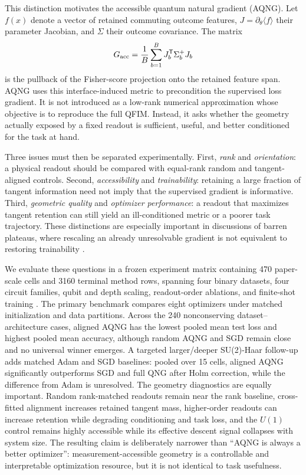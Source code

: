 This distinction motivates the accessible quantum natural gradient (AQNG). Let $f(x)$ denote a vector of retained commuting outcome features, $J=\partial_\theta\langle f\rangle$ their parameter Jacobian, and $\Sigma$ their outcome covariance. The matrix
\begin{equation}
 G_{\rm acc}=\frac{1}{B}\sum_{b=1}^{B}J_b^{\mathsf T}\Sigma_b^{+}J_b
 \label{eq:gacc_intro}
\end{equation}
is the pullback of the Fisher-score projection onto the retained feature span. AQNG uses this interface-induced metric to precondition the supervised loss gradient. It is not introduced as a low-rank numerical approximation whose objective is to reproduce the full QFIM. Instead, it asks whether the geometry actually exposed by a fixed readout is sufficient, useful, and better conditioned for the task at hand.

Three issues must then be separated experimentally. First, \emph{rank} and \emph{orientation}: a physical readout should be compared with equal-rank random and tangent-aligned controls. Second, \emph{accessibility} and \emph{trainability}: retaining a large fraction of tangent information need not imply that the supervised gradient is informative. Third, \emph{geometric quality} and \emph{optimizer performance}: a readout that maximizes tangent retention can still yield an ill-conditioned metric or a poorer task trajectory. These distinctions are especially important in discussions of barren plateaus, where rescaling an already unresolvable gradient is not equivalent to restoring trainability \cite{McClean2018}.

We evaluate these questions in a frozen experiment matrix containing 470 paper-scale cells and 3160 terminal method rows, spanning four binary datasets, four circuit families, qubit and depth scaling, readout-order ablations, and finite-shot training \cite{AQNGRepo}. The primary benchmark compares eight optimizers under matched initialization and data partitions. Across the 240 nonconserving dataset--architecture cases, aligned AQNG has the lowest pooled mean test loss and highest pooled mean accuracy, although random AQNG and SGD remain close and no universal winner emerges. A targeted larger/deeper SU(2)-Haar follow-up adds matched Adam and SGD baselines: pooled over 15 cells, aligned AQNG significantly outperforms SGD and full QNG after Holm correction, while the difference from Adam is unresolved. The geometry diagnostics are equally important. Random rank-matched readouts remain near the rank baseline, cross-fitted alignment increases retained tangent mass, higher-order readouts can increase retention while degrading conditioning and task loss, and the $U(1)$ control remains highly accessible while its effective descent signal collapses with system size. The resulting claim is deliberately narrower than ``AQNG is always a better optimizer'': measurement-accessible geometry is a controllable and interpretable optimization resource, but it is not identical to task usefulness.
